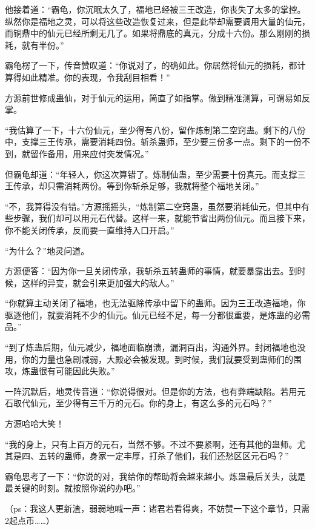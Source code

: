 \begin{this_body}
他接着道：“霸龟，你沉眠太久了，福地已经被三王改造，你丧失了太多的掌控。纵然你是福地之灵，可以将这些改造恢复过来，但是此举却需要调用大量的仙元，而铜鼎中的仙元已经所剩无几了。如果将鼎底的真元，分成十六份。那么刚刚的损耗，就有半份。”

霸龟楞了一下，传音赞叹道：“你说对了，的确如此。你居然将仙元的损耗，都计算得如此精准。你的表现，令我刮目相看！”

方源前世修成蛊仙，对于仙元的运用，简直了如指掌。做到精准测算，可谓易如反掌。

“我估算了一下，十六份仙元，至少得有八份，留作炼制第二空窍蛊。剩下的八份中，支撑三王传承，需要消耗四份。斩杀蛊师，至少要三份多一点。剩下的一份不到，就留作备用，用来应付突发情况。”

但霸龟却道：“年轻人，你这次算错了。炼制仙蛊，至少需要十份真元。而支撑三王传承，却只需消耗两份。等到你斩杀足够，我就将整个福地关闭。”

“不，我算得没有错。”方源摇摇头，“炼制第二空窍蛊，虽然要消耗仙元，但其中有些步骤，我们却可以用元石代替。这样一来，就能节省出两份仙元。而且接下来，你不能关闭传承，反而要一直维持入口开启。”

“为什么？”地灵问道。

方源便答：“因为你一旦关闭传承，我斩杀五转蛊师的事情，就要暴露出去。到时候，这样的异变，就会引来更加强大的敌人。”

“你就算主动关闭了福地，也无法驱除传承中留下的蛊师。因为三王改造福地，你驱逐他们，就要消耗不少的仙元。仙元已经不足，每一分都很重要，是炼蛊的必需品。”

“到了炼蛊后期，仙元减少，福地面临崩溃，漏洞百出，沟通外界。封闭福地也没用，你的力量也急剧减弱，大殿必会被发现。到时候，我们就要受到蛊师们的围攻，炼蛊很有可能因此失败。”

一阵沉默后，地灵传音道：“你说得很对。但是你的方法，也有弊端缺陷。若用元石取代仙元，至少得有三千万的元石。你的身上，有这么多的元石吗？”

方源哈哈大笑！

“我的身上，只有上百万的元石，当然不够。不过不要紧啊，还有其他的蛊师。尤其是四、五转的蛊师，身家一定丰厚，打杀了他们，我们还愁区区元石吗？”

霸龟思考了一下：“你说的对，我给你的帮助将会越来越小。炼蛊最后关头，就是最关键的时刻。就按照你说的办吧。”

（ps：我这人更新渣，弱弱地喊一声：诸君若看得爽，不妨赞一下这个章节，只需2起点币……）

\end{this_body}

